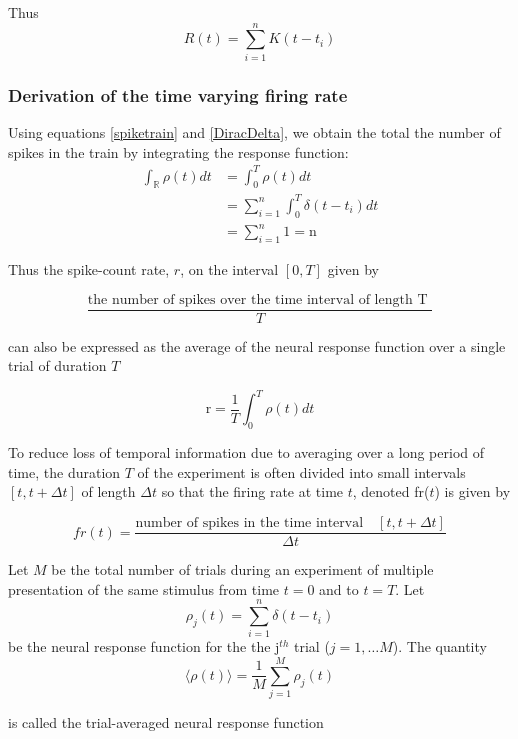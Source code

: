 Thus
\begin{equation} \label{firerate}
R(t) = \sum_{i=1}^{n} K(t-t_{i})
\end{equation}




\subsubsection{Derivation of the time varying firing rate}

Using equations \eqref{spiketrain} and \eqref{DiracDelta}, we obtain the total the number of spikes in the train by integrating the response function: 
\begin{align*}
\int_{\mathbb{R}}  \rho(t)  dt &=   \int_{0}^{T}  \rho(t)  dt\\
      &= \displaystyle  \sum_{i=1}^{n}    \int_{0}^{T}  \delta(t-t_{i}) dt\\
              & = \displaystyle  \sum_{i=1}^{n} 1 = \text{n}
\end{align*}


Thus the spike-count rate, $r$, on the interval $[0, T]$ given by

\[ \dfrac{\text{the number of spikes over the time interval of length T }}{T} \]

can also be expressed as the average of the neural response function
over a single trial of duration $T$

\begin{equation}\label{spike-count rate}
  \text{r} =  \frac{1}{T}  \int_{0}^{T}  \rho(t)  dt
\end{equation}

To reduce loss of temporal information due to averaging over a long period of time, the duration $T$ of the experiment is often divided into small intervals $[t, t+\Delta t]$ of length $\Delta t$ so that the firing rate at time $t$,
denoted fr($t$)  is  given by

\begin{equation}\label{single-trial emprical-spike count}
fr(t) = \dfrac{\text{number of spikes in the time interval} \quad [t, t+\Delta t]}
{\Delta t}
\end{equation}


\begin{Def}\label{trial-average neural response}
Let $M$ be the total number of trials during an experiment
of multiple presentation of the same stimulus from time $t=0$ and to $t=T$. 
Let \[ \rho_{j}(t) = \displaystyle \sum_{i=1}^{n} \delta(t-t_{i})\] 
be the neural response function for the the j$^{th}$ trial ($j=1, \dots M$). The quantity 
\[ \langle \rho(t) \rangle  = 
\displaystyle  \frac{1}{M} \sum_{j=1}^{M} \rho_{j}(t)\] 

is called the trial-averaged neural response function

\end{Def}

